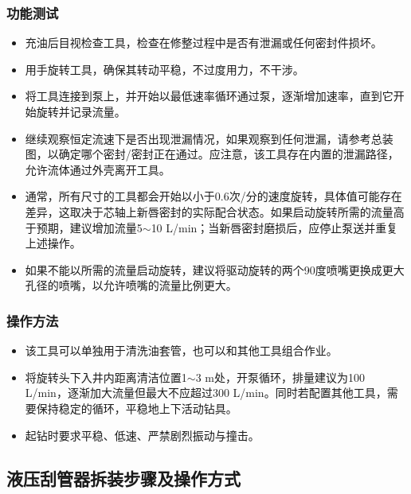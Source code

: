 \subsubsection{功能测试}
\begin{itemize}
	
	\item 充油后目视检查工具，检查在修整过程中是否有泄漏或任何密封件损坏。
	
	\item 用手旋转工具，确保其转动平稳，不过度用力，不干涉。
	
	\item 将工具连接到泵上，并开始以最低速率循环通过泵，逐渐增加速率，直到它开始旋转并记录流量。
	
	\item 继续观察恒定流速下是否出现泄漏情况，如果观察到任何泄漏，请参考总装图，以确定哪个密封/密封正在通过。应注意，该工具存在内置的泄漏路径，允许流体通过外壳离开工具。
	
	\item 通常，所有尺寸的工具都会开始以小于0.6次/分的速度旋转，具体值可能存在差异，这取决于芯轴上新唇密封的实际配合状态。如果启动旋转所需的流量高于预期，建议增加流量5$\sim$10 L/min；当新唇密封磨损后，应停止泵送并重复上述操作。
	
	\item 如果不能以所需的流量启动旋转，建议将驱动旋转的两个90度喷嘴更换成更大孔径的喷嘴，以允许喷嘴的流量比例更大。
	\end{itemize}
	
\subsubsection{操作方法}
	\begin{itemize}
		
	\item 该工具可以单独用于清洗油套管，也可以和其他工具组合作业。
	
	\item 将旋转头下入井内距离清洁位置1$\sim$3 m处，开泵循环，排量建议为100 L/min，逐渐加大流量但最大不应超过300 L/min。同时若配置其他工具，需要保持稳定的循环，平稳地上下活动钻具。
	
	\item 起钻时要求平稳、低速、严禁剧烈振动与撞击。
	\end{itemize}

\subsection{液压刮管器拆装步骤及操作方式}


